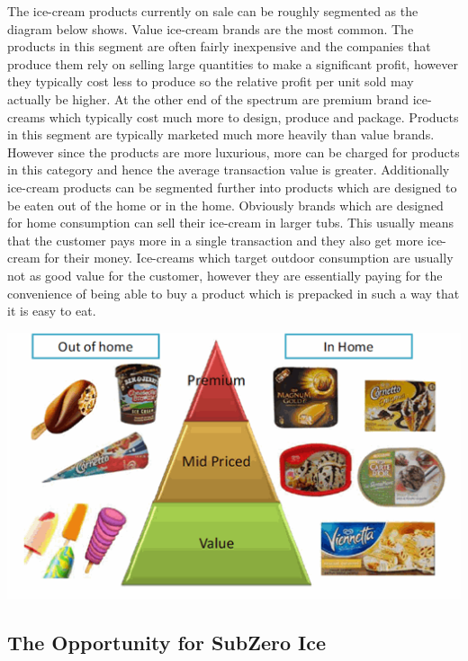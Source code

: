 \documentclass{article}
\begin{document}
  The ice-cream products currently on sale can be roughly segmented as the diagram below shows. Value ice-cream brands are the most common. The products in this segment are often fairly inexpensive and the companies that produce them rely on selling large quantities to make a significant profit, however they typically cost less to produce so the relative profit per unit sold may actually be higher. At the other end of the spectrum are premium brand ice-creams which typically cost much more to design, produce and package. Products in this segment are typically marketed much more heavily than value brands. However since the products are more luxurious, more can be charged for products in this category and hence the average transaction value is greater. Additionally ice-cream products can be segmented further into products which are designed to be eaten out of the home or in the home. Obviously brands which are designed for home consumption can sell their ice-cream in larger tubs. This usually means that the customer pays more in a single transaction and they also get more ice-cream for their money. Ice-creams which target outdoor consumption are usually not as good value for the customer, however they are essentially paying for the convenience of being able to buy a product which is prepacked in such a way that it is easy to eat. \\
\begin{center}
  \includegraphics[scale=0.7]{pricepyramid.png}
\end{center}

  \subsection{The Opportunity for SubZero Ice}
\end{document}
